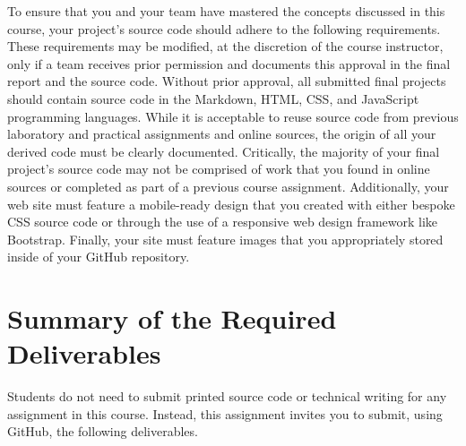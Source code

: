 \documentclass[11pt]{article}
\begin{document}
To ensure that you and your team have mastered the concepts discussed in this
course, your project's source code should adhere to the following requirements.
These requirements may be modified, at the discretion of the course instructor,
only if a team receives prior permission and documents this approval in the
final report and the source code. Without prior approval, all submitted final
projects should contain source code in the Markdown, HTML, CSS, and JavaScript
programming languages. While it is acceptable to reuse source code from previous
laboratory and practical assignments and online sources, the origin of all your
derived code must be clearly documented. Critically, the majority of your final
project's source code may not be comprised of work that you found in online
sources or completed as part of a previous course assignment. Additionally, your
web site must feature a mobile-ready design that you created with either bespoke
CSS source code or through the use of a responsive web design framework like
Bootstrap. Finally, your site must feature images that you appropriately stored
inside of your GitHub repository.

\section*{Summary of the Required Deliverables}

\noindent Students do not need to submit printed source code or technical
writing for any assignment in this course. Instead, this assignment invites you
to submit, using GitHub, the following deliverables.

\vspace*{-0.05in}
\end{document}
